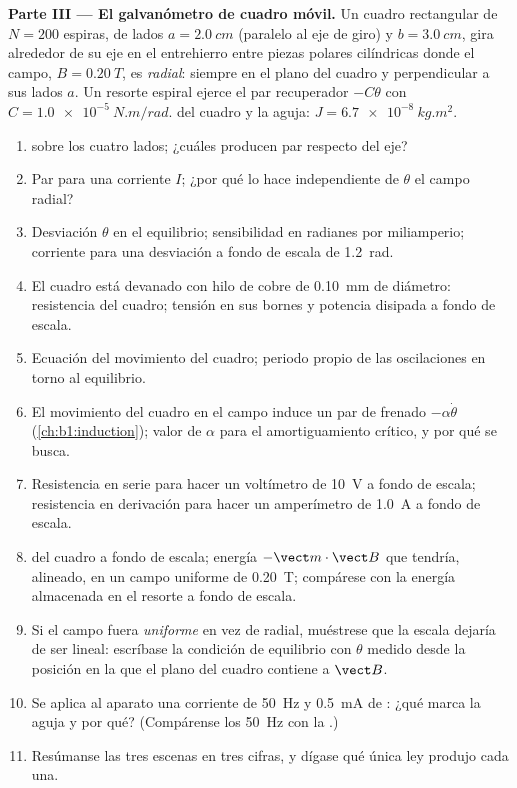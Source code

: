 \begin{problem}
\medskip
\noindent\textbf{Parte III --- El galvanómetro de cuadro móvil.}
Un cuadro rectangular de $N = 200$ espiras, de lados $a = \qty{2.0}{cm}$ (paralelo
al eje de giro) y $b = \qty{3.0}{cm}$, gira alrededor de su eje en el
entrehierro entre piezas polares cilíndricas donde el campo,
$B = \qty{0.20}{T}$, es \emph{radial}: siempre en el plano del cuadro y
perpendicular a sus lados $a$. Un resorte espiral ejerce el par
recuperador $-C\theta$ con $C = \qty{1.0e-5}{N.m/rad}$. 
del cuadro y la aguja: $J = \qty{6.7e-8}{kg.m^2}$.
\begin{enumerate}[resume]
  \item {} sobre los cuatro lados; ¿cuáles producen par
        respecto del eje?
  \item Par para una corriente $I$; ¿por qué lo hace independiente de
        $\theta$ el campo radial?
  \item Desviación $\theta$ en el equilibrio; sensibilidad en radianes por
        miliamperio; corriente para una desviación a fondo de escala de \qty{1.2}{rad}.
  \item El cuadro está devanado con hilo de cobre de \qty{0.10}{mm} de
        diámetro: resistencia del cuadro; tensión en sus bornes y potencia
        disipada a fondo de escala.
  \item Ecuación del movimiento del cuadro; periodo propio de las
        oscilaciones en torno al equilibrio.
  \item El movimiento del cuadro en el campo induce un par de frenado
        $-\alpha\dot\theta$ (\cref{ch:b1:induction}); valor de $\alpha$ para
        el amortiguamiento crítico, y por qué se busca.
  \item Resistencia en serie para hacer un voltímetro de \qty{10}{V} a
        fondo de escala; resistencia en derivación para hacer un
        amperímetro de \qty{1.0}{A} a fondo de escala.
  \item {} del cuadro a fondo de escala; energía $-\vect m\cdot
        \vect B$ que tendría, alineado, en un campo uniforme de \qty{0.20}{T};
        compárese con la energía almacenada en el resorte a fondo de escala.
  \item Si el campo fuera \emph{uniforme} en vez de radial, muéstrese que
        la escala dejaría de ser lineal: escríbase la condición de
        equilibrio con $\theta$ medido desde la posición en la que el
        plano del cuadro contiene a $\vect B$.
  \item Se aplica al aparato una corriente de \qty{50}{Hz} y \qty{0.5}{mA}
        de : ¿qué marca la aguja y por qué? (Compárense los
        \qty{50}{Hz} con la .)
  \item Resúmanse las tres escenas en tres cifras, y dígase qué única ley
        produjo cada una.
\end{enumerate}
\end{problem}
